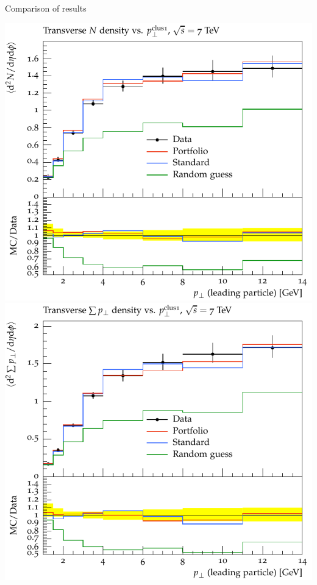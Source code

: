 \begin{frame}{Comparison of results}
    \begin{minipage}{.04\textwidth}%
    \end{minipage}%
    \begin{minipage}{.48\textwidth}%
        \begin{center}
            \includegraphics[width=.92\textwidth]{oo/test_cmp_1_std/ATLAS_2011_S8994773/d02-x01-y01.pdf}\\
            \includegraphics[width=.92\textwidth]{oo/test_cmp_1_std/ATLAS_2011_S8994773/d04-x01-y01.pdf}
        \end{center}
    \end{minipage}%
\end{frame}
